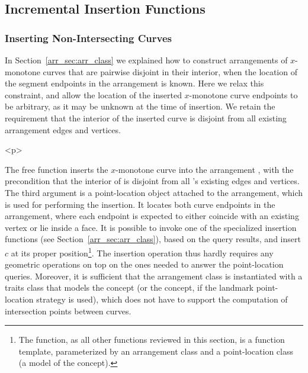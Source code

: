 \subsection{Incremental Insertion Functions}
\label{arr_ssec:inc_insert}
%
\subsubsection{Inserting Non-Intersecting Curves}
\label{arr_sssec:insert_non_x}
%
In Section~\ref{arr_sec:arr_class} we explained how to construct
arrangements of $x$-monotone curves that are pairwise disjoint in
their interior, when the location of the segment endpoints in the
arrangement is known. Here we relax this constraint, and allow the
location of the inserted $x$-monotone curve endpoints to be arbitrary,
as it may be unknown at the time of insertion. We retain the
requirement that the interior of the inserted curve is disjoint from
all existing arrangement edges and vertices.

\begin{ccHtmlOnly}<p>\end{ccHtmlOnly}
The free function 
inserts the $x$-monotone curve  into the arrangement ,
with the precondition that the interior of  is disjoint from
all 's existing edges and vertices. The third argument
 is a point-location object attached to the arrangement,
which is used for performing the insertion. It locates both curve
endpoints in the arrangement, where each endpoint is expected to
either coincide with an existing vertex or lie inside a face.
It is possible to invoke one of the specialized insertion functions
(see Section~\ref{arr_sec:arr_class}), based on the query results, and
insert $c$ at its proper position\footnote{The
 function, as all other functions
reviewed in this section, is a function template, parameterized by an
arrangement class and a point-location class (a model of the
 concept).}. The insertion operation
thus hardly requires any geometric operations on top on the ones
needed to answer the point-location queries. Moreover, it is
sufficient that the arrangement class is instantiated with a
traits class that models the 
concept (or the  concept, if the
landmark point-location strategy is used), which does not have to
support the computation of intersection points between curves.

